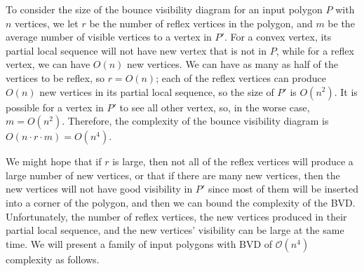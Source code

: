 \documentclass[]{styles/svproc}  %
\begin{document}
To consider the size of the bounce visibility diagram for an input polygon $P$
with $n$ vertices, we let $r$ be the number of reflex vertices in the polygon,
and $m$ be the average number of visible vertices to a vertex in $P'$. For a
convex vertex, its partial local sequence will not have new vertex that is not
in $P$, while for a reflex vertex, we can have $O(n)$ new vertices. We can have
as many as half of the vertices to be reflex, so $r = O(n)$; each of the reflex
vertices can produce $O(n)$ new vertices in its partial local sequence, so the
size of $P'$ is $O(n^2)$. It is possible for a vertex in $P'$ to see all other
vertex, so, in the worse case, $m = O(n^2)$. Therefore, the complexity of the
bounce visibility diagram is $O(n\cdot r\cdot m) = O(n^4)$.

We might hope that if $r$ is large, then not all of the reflex vertices will
produce a large number of new vertices, or that if there are many new vertices,
then the new vertices will not have good visibility in $P'$ since most of them
will be inserted into a corner of the polygon, and then we can bound the
complexity of the BVD. Unfortunately, the number of reflex vertices, the new
vertices produced in their partial local sequence, and the new vertices'
visibility can be large at the same time. We will present a family of input
polygons with BVD of $\mathcal{O}(n^4)$ complexity as follows.
\end{document}
